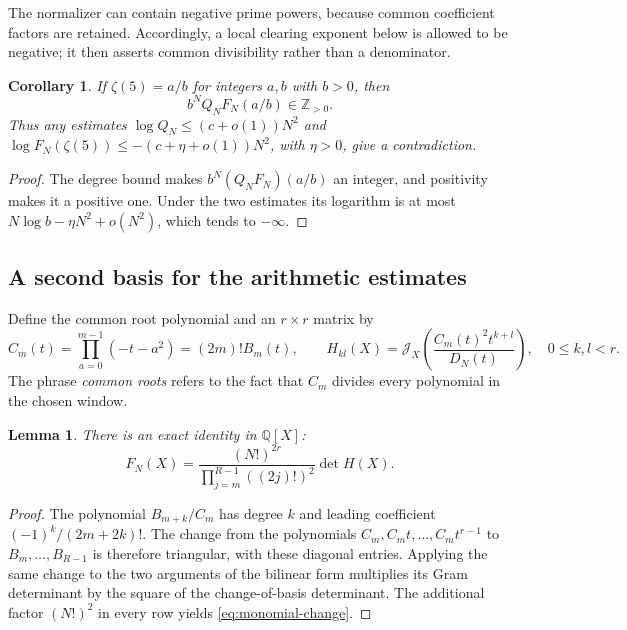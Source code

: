 \documentclass[11pt,letterpaper]{article}
\newtheorem{lemma}[lemma]{Lemma}
\newtheorem{corollary}[corollary]{Corollary}
\theoremstyle{definition}
\newcommand{\Q}{\mathbb Q}
\newcommand{\Z}{\mathbb Z}
\newcommand{\J}{\mathcal J}
\begin{document}
The normalizer can contain negative prime powers, because common
coefficient factors are retained. Accordingly, a local clearing exponent
below is allowed to be negative; it then asserts common divisibility
rather than a denominator.

\begin{corollary}\label{cor:closing-criterion}
If $\zeta(5)=a/b$ for integers $a,b$ with $b>0$, then
\begin{equation}\label{eq:positive-integer}
 b^NQ_NF_N(a/b)\in\Z_{>0}.
\end{equation}
Thus any estimates
$\log Q_N\le (c+o(1))N^2$ and
$\log F_N(\zeta(5))\le-(c+\eta+o(1))N^2$, with $\eta>0$,
give a contradiction.
\end{corollary}
\begin{proof}
The degree bound makes $b^N(Q_NF_N)(a/b)$ an integer, and positivity
makes it a positive one. Under the two estimates its logarithm is at
most $N\log b-\eta N^2+o(N^2)$, which tends to $-\infty$.
\end{proof}

\subsection{A second basis for the arithmetic estimates}
Define the common root polynomial and an $r\times r$ matrix by
\[
 C_m(t)=\prod_{a=0}^{m-1}(-t-a^2)=(2m)!B_m(t),\qquad
 H_{kl}(X)=\J_X\left(\frac{C_m(t)^2t^{k+l}}{D_N(t)}\right),
 \quad 0\le k,l<r.
\]
The phrase \emph{common roots} refers to the fact that $C_m$ divides
every polynomial in the chosen window.

\begin{lemma}\label{lem:basis-change}
There is an exact identity in $\Q[X]$:
\begin{equation}\label{eq:monomial-change}
 F_N(X)=\frac{(N!)^{2r}}{\prod_{j=m}^{R-1}((2j)!)^2}\det H(X).
\end{equation}
\end{lemma}
\begin{proof}
The polynomial $B_{m+k}/C_m$ has degree $k$ and leading coefficient
$(-1)^k/(2m+2k)!$. The change from the polynomials
$C_m,C_mt,\ldots,C_mt^{r-1}$ to $B_m,\ldots,B_{R-1}$ is therefore
triangular, with these diagonal entries. Applying the same change to
the two arguments of the bilinear form multiplies its Gram determinant
by the square of the change-of-basis determinant. The additional
factor $(N!)^2$ in every row yields \eqref{eq:monomial-change}.
\end{proof}
\end{document}
